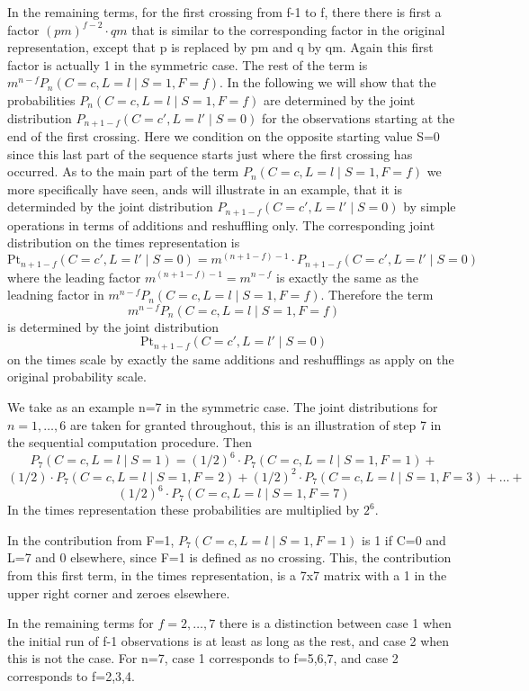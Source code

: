 In the remaining terms, for the first crossing from f-1 to f, there there is first a factor $(pm)^{f-2} \cdot  qm$ that is similar to the corresponding factor in the original representation, except that p is replaced by pm and q by qm. Again this first factor is actually 1 in the symmetric case. The rest of the term is $m^{n-f} P_n ( C=c, L=l \mid S=1, F=f)$. In the following we will show that the probabilities $P_n ( C=c, L=l \mid S=1, F=f)$ are determined by the joint distribution $P_{n+1-f} ( C=c', L=l' \mid S=0)$ for the observations starting at the end of the first crossing. Here we condition on the opposite starting value S=0 since this last part of the sequence starts just where the first crossing has occurred. As to the main part of the term $P_n ( C=c, L=l \mid S=1, F=f)$ we more specifically have seen, ands will illustrate in an example, that it is determinded by the joint distribution $P_{n+1-f} ( C=c', L=l' \mid S=0)$ by simple operations in terms of additions and reshuffling only. The corresponding joint distribution on the times representation is $$\text{Pt}_{n+1-f} ( C=c', L=l' \mid S=0)=m^{(n+1-f)-1} \cdot P_{n+1-f} ( C=c', L=l' \mid S=0)$$ where the leading factor $m^{(n+1-f)-1}=m^{n-f}$ is exactly the same as the leadning factor in $m^{n-f} P_n ( C=c, L=l \mid S=1, F=f)$. Therefore the term $$m^{n-f} P_n ( C=c, L=l \mid S=1, F=f)$$ is determined by the joint distribution $$\text{Pt}_{n+1-f} ( C=c', L=l' \mid S=0)$$ on the times scale by exactly the same additions and reshufflings as apply on the original probability scale.

We take as an example n=7 in the symmetric case. The joint distributions for $n=1, \ldots, 6$ are taken for granted throughout, this is an illustration of step 7 in the sequential computation procedure. Then $$P_7 (C=c, L=l \mid S=1) = (1/2)^6 \cdot   P_7 (C=c, L=l \mid S=1,F=1) +    $$  $$(1/2) \cdot P_7 (C=c, L=l \mid S=1,F=2) + (1/2)^2 \cdot P_7 (C=c, L=l \mid S=1,F=3) + \ldots  +$$ $$(1/2)^6 \cdot P_7 (C=c, L=l \mid S=1,F=7) $$
In the times representation these probabilities are multiplied by $2^6$. 

In the contribution from F=1, $P_7 (C=c, L=l \mid S=1,F=1)$ is 1 if C=0 and L=7 and 0 elsewhere, since F=1 is defined as no crossing. This, the contribution from this first term, in the times representation, is a 7x7 matrix with a 1 in the upper right corner and zeroes elsewhere. 

In the remaining terms for $f=2, \ldots, 7$ there is a distinction between case 1 when the initial run of f-1 observations is at least as long as the rest, and case 2 when this is not the case. For n=7, case 1 corresponds to f=5,6,7, and case 2 corresponds to f=2,3,4. 

